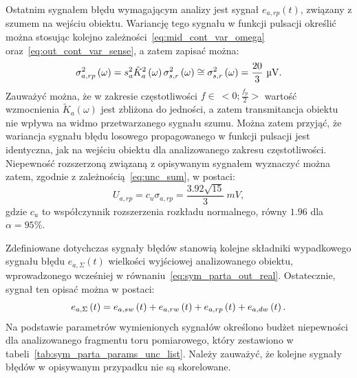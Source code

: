 Ostatnim sygnałem błędu wymagającym analizy jest sygnał $e_{a,rp}(t)$, związany z szumem na wejściu obiektu. Wariancję tego sygnału w funkcji pulsacji określić można stosując kolejno zależności~\eqref{eq:mid_cont_var_omega} oraz~\eqref{eq:out_cont_var_sense}, a zatem zapisać można:
\begin{equation}
\sigma_{a,rp}^{2} \emb{\omega} = s_{a}^{2} \tilde{K}_{a}^{2} \emb{\omega} \sigma_{s,r}^{2} \emb{\omega} \cong \sigma_{s,r}^{2} \emb{\omega} = \frac{20}{3}~\unit{\micro V} \label{eq:sym_parta_rand_prop_var_omega}.
\end{equation}
Zauważyć można, że w zakresie częstotliwości $f \in~<0;\frac{f_{p}}{2}>$ wartość wzmocnienia $\tilde{K}_{a}(\omega)$ jest zbliżona do jedności, a zatem transmitancja obiektu nie wpływa na widmo przetwarzanego sygnału szumu. Można zatem przyjąć, że wariancja sygnału błędu losowego propagowanego w funkcji pulsacji jest identyczna, jak na wejściu obiektu dla analizowanego zakresu częstotliwości. Niepewność rozszerzoną związaną z opisywanym sygnałem wyznaczyć można zatem, zgodnie z zależnością~\eqref{eq:unc_sum}, w postaci:
\begin{equation}
U_{a,rp} = c_{u} \sigma_{a,rp} = \frac{3.92 \sqrt{15}}{3}~\unit{mV} \label{eq:sym_parta_rand_prop_unc},
\end{equation}
gdzie $c_{u}$ to współczynnik rozszerzenia rozkładu normalnego, równy $1.96$ dla $\alpha = 95\%$.

Zdefiniowane dotychczas sygnały błędów stanowią kolejne składniki wypadkowego sygnału błędu $e_{a,\Sigma}(t)$ wielkości wyjściowej analizowanego obiektu, wprowadzonego wcześniej w równaniu~\eqref{eq:sym_parta_out_real}. Ostatecznie, sygnał ten opisać można w postaci:
\begin{equation}
e_{a,\Sigma} \left(t\right) = e_{a,sw} \left(t\right) + e_{a,rw} \left(t\right) + e_{a,rp} \left(t\right) + e_{a,dw} \left(t\right) \label{eq:sym_parta_error_sum}.
\end{equation}
Na podstawie parametrów wymienionych sygnałów określono budżet niepewności dla analizowanego fragmentu toru pomiarowego, który zestawiono w tabeli~\ref{tab:sym_parta_params_unc_list}. Należy zauważyć, że kolejne sygnały błędów w opisywanym przypadku nie są skorelowane.

